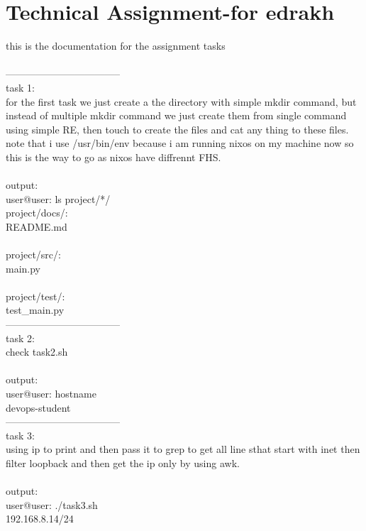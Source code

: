 \documentclass[a4paper,14pt]{extarticle}
\author{}
\date{}
\begin{document}
\noindent
\newpage

\section*{Technical Assignment-for edrakh}
this is the documentation for the assignment tasks\\
\\
-----------------------------------\\
task 1:\\
for the first task we just create a the directory with simple mkdir command, but instead of multiple mkdir command we just create them from single command using simple RE, then touch to create the files and cat any thing to these files.\\
note that i use /usr/bin/env because i am running nixos on my machine now so this is the way to go as nixos have diffrennt FHS.\\
\\
output:\\
user@user:  ls project/*/\\
project/docs/:\\
README.md\\
\\
project/src/:\\
main.py\\
\\
project/test/:\\
test\_main.py\\
-----------------------------------\\
task 2:\\
check task2.sh\\
\\
output:\\
user@user:  hostname\\
devops-student\\
-----------------------------------\\
task 3:\\
using ip to print and then pass it to grep to get all line sthat start with inet then filter loopback and then get the ip only by using awk.\\
\\
output:\\
user@user:  ./task3.sh\\
192.168.8.14/24\\
\end{document}
